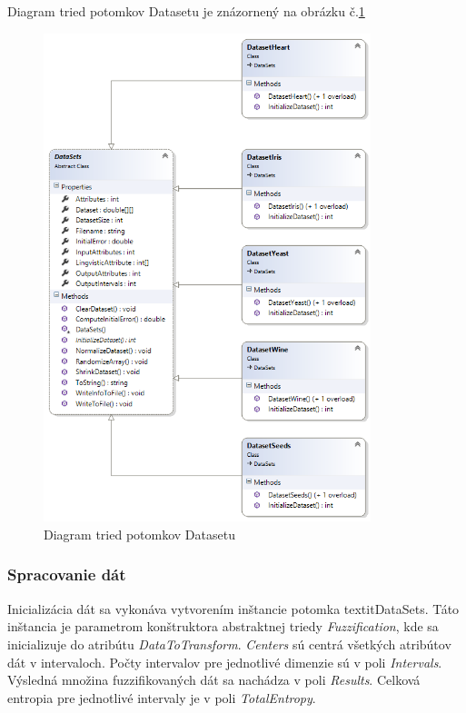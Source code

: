 Diagram tried potomkov Datasetu je znázornený na obrázku č.\ref{fig:umldiagramdatasetou}  
\begin{figure}[ht!]
\includegraphics[width=0.85\textwidth]{obrazky/umldatasetov.png}
\centering
\caption{Diagram tried potomkov Datasetu } 
\label{fig:umldiagramdatasetou}
\end{figure}


\subsubsection{Spracovanie dát}
Inicializácia dát sa vykonáva vytvorením inštancie potomka textit{DataSets}. 
Táto inštancia je parametrom konštruktora abstraktnej triedy \textit{Fuzzification}, kde sa inicializuje do atribútu \textit{DataToTransform}. \textit{Centers} sú centrá všetkých atribútov dát v intervaloch.
Počty intervalov pre jednotlivé dimenzie sú v poli \textit{Intervals}. Výsledná množina fuzzifikovaných dát sa nachádza v poli \textit{Results}. Celková entropia pre jednotlivé intervaly je v poli \textit{TotalEntropy}. 

